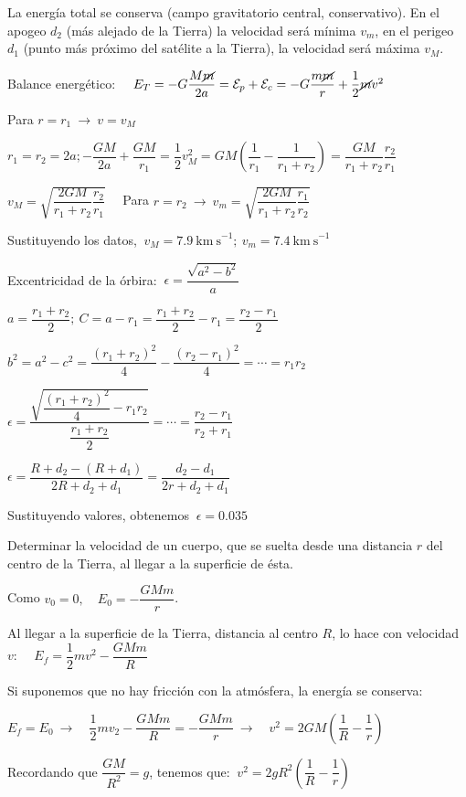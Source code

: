 La energía total se conserva (campo gravitatorio central, conservativo). En el apogeo $d_2$ (más alejado de la Tierra) la velocidad será mínima $v_m$, en el perigeo $d_1$ (punto más próximo del satélite a la Tierra), la velocidad será máxima $v_M$.

Balance energético:
$\quad E_{T}=-G\dfrac{M\cancel{m}}{2a}=\mathcal E_p+\mathcal E_c=-G\dfrac{m\cancel{m}}{r}+\dfrac 1 2 \cancel{m} v^2$ 

Para $r=r_1 \ \to \ v=v_M$

$r_1=r_2=2a; -\dfrac{GM}{2a}+\dfrac{GM}{r_1}=\dfrac 1 2 v_M^2=GM\left( \dfrac{1}{r_1}-\dfrac{1}{r_1+r_2} \right)=\dfrac{GM}{r_1+r_2} \dfrac{r_2}{r_1}$

$ v_M=\sqrt{ \dfrac{2GM}{r_1+r_2} \dfrac{r_2}{r_1} } \quad $
Para $r=r_2 \ \to \ v_m=\sqrt{ \dfrac{2GM}{r_1+r_2} \dfrac{r_1}{r_2} }$

Sustituyendo los datos, $\ v_M=7.9\ \mathrm{km\ s}^{-1};\  v_m=7.4\ \mathrm{km\ s}^{-1}$

 Excentricidad de la órbira:  $\ \epsilon = \dfrac{\sqrt{a^2-b^2}}a$
 
 $a=\dfrac{r_1+r_2}{2};\ C=a-r_1=\dfrac{r_1+r_2}{2}-r_1=\dfrac{r_2-r_1}{2}$
 
 $b^2=a^2-c^2=\dfrac{(r_1+r_2)^2}{4}-\dfrac{(r_2-r_1)^2}{4}=\cdots=r_1r_2$
 
 $\epsilon=\dfrac{\sqrt{\dfrac{(r_1+r_2)^2}{4}-r_1r_2}}{\dfrac{r_1+r_2}{2}}=\cdots=\dfrac{r_2-r_1}{r_2+r_1}$
 
 $\epsilon= \dfrac{R+d_2-(R+d_1)}{2R+d_2+d_1}=\dfrac{d_2-d_1}{2r+d_2+d_1}$
 
 Sustituyendo valores, obtenemos $\ \epsilon=0.035$

\begin{prob}
Determinar la velocidad de un cuerpo, que se suelta desde una distancia $r$ del centro de la Tierra, al llegar a la superficie de ésta.	
\end{prob}
Como $v_0=0, \quad E_0=-\dfrac{GMm}{r}$. 

Al llegar a la superficie de la Tierra, distancia al centro $R$, lo hace con velocidad $v$:
$\quad E_f=\dfrac 1 2 m v^2-\dfrac{GMm}{R}$

Si suponemos que no hay fricción con la atmósfera, la energía se conserva:

$E_f=E_0 \ \to \quad \dfrac 1 2 m v_2-\dfrac{GMm}{R}=-\dfrac{GMm}{r} \ \to \quad v^2=2GM\left( \dfrac 1 R - \dfrac 1 r \right)$

Recordando que $\dfrac{GM}{R^2}=g$, tenemos que: $\ v^2=2gR^2\left( \dfrac 1 R - \dfrac 1 r \right)$

